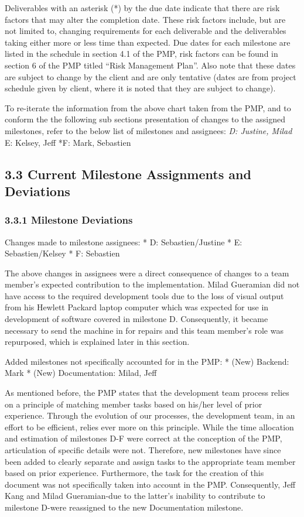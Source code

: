 \documentclass[]{article}
\begin{document}
Deliverables with an asterisk (*) by the due date indicate that there
are risk factors that may alter the completion date. These risk factors
include, but are not limited to, changing requirements for each
deliverable and the deliverables taking either more or less time than
expected. Due dates for each milestone are listed in the schedule in
section 4.1 of the PMP, risk factors can be found in section 6 of the
PMP titled ``Risk Management Plan''. Also note that these dates are
subject to change by the client and are only tentative (dates are from
project schedule given by client, where it is noted that they are
subject to change).

To re-iterate the information from the above chart taken from the PMP,
and to conform the the following sub sections presentation of changes to
the assigned milestones, refer to the below list of milestones and
assignees: \emph{D: Justine, Milad }E: Kelsey, Jeff *F: Mark, Sebastien

\subsection{\textbf{3.3 Current Milestone Assignments and
Deviations}}\label{current-milestone-assignments-and-deviations}

\subsubsection{\textbf{3.3.1 Milestone
Deviations}}\label{milestone-deviations}

Changes made to milestone assignees: * D: Sebastien/Justine * E:
Sebastien/Kelsey * F: Sebastien

The above changes in assignees were a direct consequence of changes to a
team member's expected contribution to the implementation. Milad
Gueramian did not have access to the required development tools due to
the loss of visual output from his Hewlett Packard laptop computer which
was expected for use in development of software covered in milestone D.
Consequently, it became necessary to send the machine in for repairs and
this team member's role was repurposed, which is explained later in this
section.

Added milestones not specifically accounted for in the PMP: * (New)
Backend: Mark * (New) Documentation: Milad, Jeff

As mentioned before, the PMP states that the development team process
relies on a principle of matching member tasks based on his/her level of
prior experience. Through the evolution of our processes, the
development team, in an effort to be efficient, relies ever more on this
principle. While the time allocation and estimation of milestones D-F
were correct at the conception of the PMP, articulation of specific
details were not. Therefore, new milestones have since been added to
clearly separate and assign tasks to the appropriate team member based
on prior experience. Furthermore, the task for the creation of this
document was not specifically taken into account in the PMP.
Consequently, Jeff Kang and Milad Gueramian-due to the latter's
inability to contribute to milestone D-were reassigned to the new
Documentation milestone.
\end{document}
